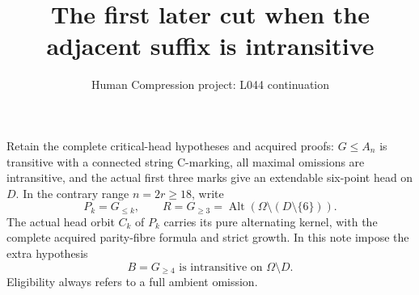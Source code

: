 \documentclass[11pt,a4paper]{article}
\title{The first later cut when the adjacent suffix is intransitive}
\author{Human Compression project: L044 continuation}
\date{}
\begin{document}
\maketitle
Retain the complete critical-head hypotheses and acquired proofs:
$G\le A_n$ is transitive with a connected string C-marking,
all maximal omissions are intransitive, and the actual first three
marks give an extendable six-point head on $D$. In the contrary
range $n=2r\ge18$, write
\[
 P_k=G_{\le k},\qquad R=G_{\ge3}
       =\operatorname{Alt}(\Omega\setminus(D\setminus\{6\})).
\]
The actual head orbit $C_k$ of $P_k$ carries its pure alternating
kernel, with the complete acquired parity-fibre formula and strict
growth. In this note impose the extra hypothesis
\[
                    B=G_{\ge4}\text{ is intransitive on }
                    \Omega\setminus D.                 \tag{1}
\]
Eligibility always refers to a full ambient omission.
\end{document}
